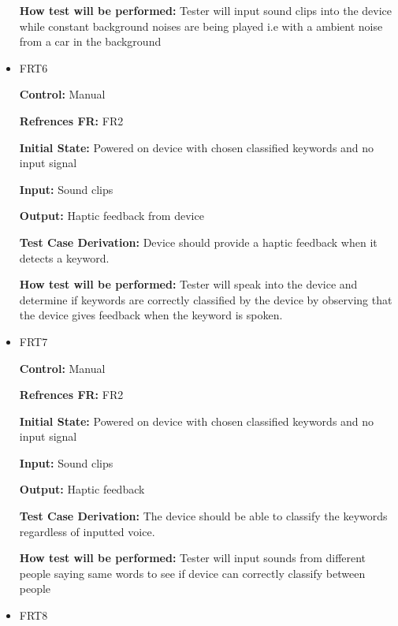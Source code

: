 \documentclass[12pt, titlepage]{article}
\begin{document}
\begin{itemize}
\textbf{How test will be performed:} Tester will input sound clips into the device while constant background noises are being played i.e with a ambient noise from a car in the background


\item{FRT6}

\textbf{Control:} Manual

\textbf{Refrences FR:} FR2 					

\textbf{Initial State:} Powered on device with chosen classified keywords and no input signal 
					
\textbf{Input:} Sound clips
					
\textbf{Output:} Haptic feedback from device

\textbf{Test Case Derivation:} Device should provide a haptic feedback when it detects a keyword.
					
\textbf{How test will be performed:} Tester will speak into the device and determine if keywords are correctly classified by the device by observing that the device gives feedback when the keyword is spoken.


\item{FRT7}

\textbf{Control:} Manual

\textbf{Refrences FR:} FR2 					

\textbf{Initial State:} Powered on device with chosen classified keywords and no input signal 
					
\textbf{Input:} Sound clips
					
\textbf{Output:} Haptic feedback

\textbf{Test Case Derivation:} The device should be able to classify the keywords regardless of inputted voice.
					
\textbf{How test will be performed:} Tester will input sounds from different people saying same words to see if device can correctly classify between people 


\item{FRT8}


\end{itemize}
\end{document}
